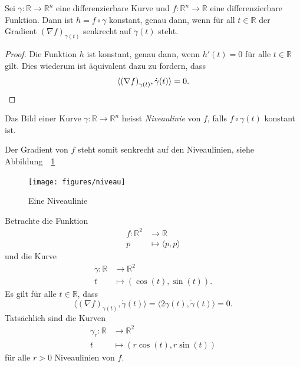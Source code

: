 \documentclass[../main.tex]{subfiles}
\begin{document}
\begin{proposition*}
  Sei $\gamma \colon \mathbb{R} \to \mathbb{R}^n$
  eine differenzierbare Kurve und
  $f \colon \mathbb{R}^n \to \mathbb{R}$ eine
  differenzierbare Funktion.
  Dann ist $h = f \circ \gamma$ konstant, genau dann,
  wenn für all $t \in \mathbb{R}$
  der Gradient ${(\nabla f)}_{\gamma(t)}$ senkrecht auf
  $\dot \gamma(t)$ steht.
\end{proposition*}

\begin{proof}
  Die Funktion $h$ ist konstant, genau dann,
  wenn $h'(t) = 0$ für alle $t \in \mathbb{R}$ gilt.
  Dies wiederum ist äquivalent dazu zu fordern, dass
  \[
    \langle {(\nabla f)}_{\gamma(t)}, \dot \gamma(t) \rangle = 0.
    \qedhere
  \]
\end{proof}

\begin{definition}
  Das Bild einer Kurve $\gamma \colon \mathbb{R} \to \mathbb{R}^n$
  heisst \emph{Niveaulinie} von $f$,
  falls $f \circ \gamma(t)$ konstant ist.
\end{definition}

Der Gradient von $f$ steht somit senkrecht auf den Niveaulinien, siehe Abbildung~~\ref{fig:niveau}

\begin{figure}[htb]
  \centering
  \texttt{[image: figures/niveau]}
  \caption{Eine Niveaulinie}%
  \label{fig:niveau}
\end{figure}

\begin{example}
  Betrachte die Funktion
  \begin{align*}
    f \colon \mathbb{R}^2 & \to \mathbb{R} \\
    p & \mapsto \langle p, p \rangle
  \end{align*}
  und die Kurve
  \begin{align*}
    \gamma \colon \mathbb{R} & \to \mathbb{R}^2 \\
    t & \mapsto (\cos(t), \sin(t)).
  \end{align*}
  Es gilt für alle $t \in \mathbb{R}$,
  dass
  \[
  \langle {(\nabla f)}_{\gamma(t)}, \dot \gamma(t) \rangle
  = \langle 2 \gamma(t), \dot \gamma(t) \rangle = 0.
  \]
  Tatsächlich sind die Kurven
  \begin{align*}
    \gamma_r \colon \mathbb{R} & \to \mathbb{R}^2 \\
    t & \mapsto (r\cos(t), r\sin(t))
  \end{align*}
  für alle $r > 0$ Niveaulinien von $f$.
\end{example}
\end{document}
